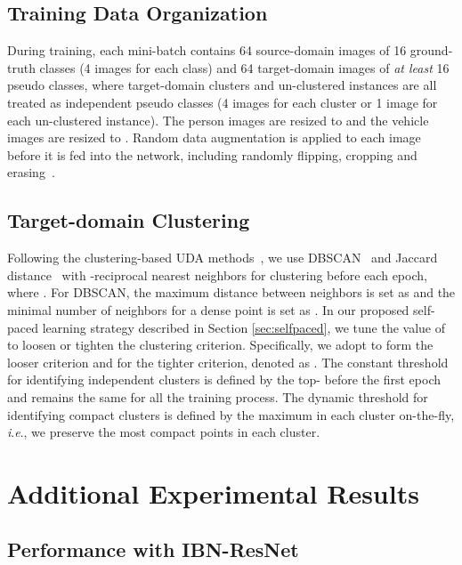 \documentclass{article}
\newcommand{\ie}{\textit{i}.\textit{e}., }
\begin{document}
\subsection{Training Data Organization}


During training, each mini-batch contains 64 source-domain images of 16 ground-truth classes (4 images for each class) and 64 target-domain images of \textit{at least} 16 pseudo classes, 
where target-domain clusters and un-clustered instances are all treated as independent pseudo classes (4 images for each cluster or 1 image for each un-clustered instance).
The person images are resized to  and the vehicle images are resized to .
Random data augmentation is applied to each image before it is fed into the network, including randomly flipping, cropping and erasing~\cite{zhong2017random}.

\subsection{Target-domain Clustering} 
\label{sec:app_cluster}


Following the clustering-based UDA methods~\cite{ge2020mutual,yang2019selfsimilarity,song2018unsupervised}, 
we use DBSCAN~\cite{ester1996density} and Jaccard distance~\cite{zhong2017re} with -reciprocal nearest neighbors for clustering before each epoch, where .
For DBSCAN,
the maximum distance between neighbors is set as  and the minimal number of neighbors for a dense point is set as .
In our proposed self-paced learning strategy described in Section \ref{sec:selfpaced},
we tune the value of  to loosen or tighten the clustering criterion.
Specifically, we adopt  to form the looser criterion and  for the tighter criterion, denoted as .
The constant threshold  for identifying independent clusters is defined by the top-  before the first epoch and remains the same for all the training process.
The dynamic threshold  for identifying compact clusters is defined by the maximum  in each cluster on-the-fly, \ie we preserve the most compact points in each cluster.


\section{Additional Experimental Results}

\subsection{Performance with IBN-ResNet \cite{pan2018two}}
\end{document}
